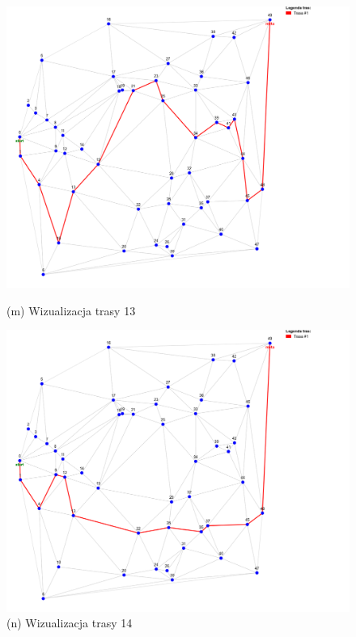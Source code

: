 \documentclass{article}
\begin{document}
\clearpage

\begin{figure}[H]
    \centering
    \begin{minipage}[b]{0.48\linewidth}
        \includegraphics[width=\linewidth]{13.png}
        \caption*{(m) Wizualizacja trasy 13}
    \end{minipage}
    \hfill
    \begin{minipage}[b]{0.48\linewidth}
        \includegraphics[width=\linewidth]{14.png}
        \caption*{(n) Wizualizacja trasy 14}
    \end{minipage}
    \vspace{0.5em}


\end{figure}
\end{document}
